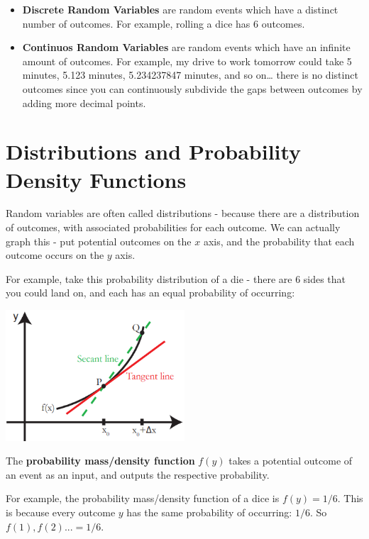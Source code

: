 \documentclass[
  a4paper,
]{report}
\begin{document}
\begin{itemize}
\item
  \textbf{Discrete Random Variables} are random events which have a
  distinct number of outcomes. For example, rolling a dice has 6
  outcomes.
\item
  \textbf{Continuos Random Variables} are random events which have an
  infinite amount of outcomes. For example, my drive to work tomorrow
  could take 5 minutes, 5.123 minutes, 5.234237847 minutes, and so
  on\ldots{} there is no distinct outcomes since you can continuously
  subdivide the gaps between outcomes by adding more decimal points.
\end{itemize}

\section{Distributions and Probability Density
Functions}\label{distributions-and-probability-density-functions}

Random variables are often called distributions - because there are a
distribution of outcomes, with associated probabilities for each
outcome. We can actually graph this - put potential outcomes on the
\(x\) axis, and the probability that each outcome occurs on the \(y\)
axis.

For example, take this probability distribution of a die - there are 6
sides that you could land on, and each has an equal probability of
occurring:

\begin{center}
\includegraphics[width=0.5\textwidth,height=\textheight]{figures/1/2.1.png}
\end{center}

The \textbf{probability mass/density function} \(f(y)\) takes a
potential outcome of an event as an input, and outputs the respective
probability.

For example, the probability mass/density function of a dice is
\(f(y) = 1/6\). This is because every outcome \(y\) has the same
probability of occurring: \(1/6\). So \(f(1), f(2)... = 1/6\).
\end{document}
